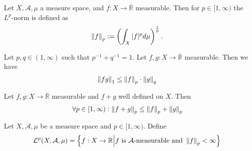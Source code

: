 \begin{definition}[\(L^p\)-Norm]
    Let \(X, \mathcal{A}, \mu\) a measure space, and \(f: X \rightarrow \overline{\mathbb{R}}\) measurable. Then for \(p \in [1, \infty)\) the \(L^p\)-norm is defined as
    \begin{align}
        \left\lVert f\right\rVert_p := \left( \int_X |f|^p d\mu \right)^{\frac{1}{p}} \text{.}
    \end{align}
\end{definition}
\begin{theorem}
    Let \(p, q \in (1, \infty)\) such that \(p^{-1} + q^{-1} =1\). Let \(f, g: X \rightarrow \overline{\mathbb{R}}\) measurable. Then we have
    \begin{align}
        \left\lVert fg\right\rVert_1 \leq \left\lVert f\right\rVert_p \cdot \left\lVert g\right\rVert_q
    \end{align}
\end{theorem}
\begin{theorem}
    Let \(f, g: X \rightarrow \overline{\mathbb{R}}\) measurable and \(f + g\) well defined on \(X\). Then
    \begin{align}
        \forall p \in [1, \infty) : \left\lVert f + g\right\rVert_p \leq \left\lVert f\right\rVert_p + \left\lVert g\right\rVert_p
    \end{align}
\end{theorem}
\begin{definition}
    Let \(X, \mathcal{A}, \mu\) be a measure space and \(p \in [1, \infty)\). Define
    \begin{align}
        \mathcal{L}^p(X, \mathcal{A}, \mu) = \left\{f: X \rightarrow \mathbb{R} \middle| f \text{ is \(\mathcal{A}\)-measurable and } \left\lVert f\right\rVert_p < \infty \right\}
    \end{align}
\end{definition}